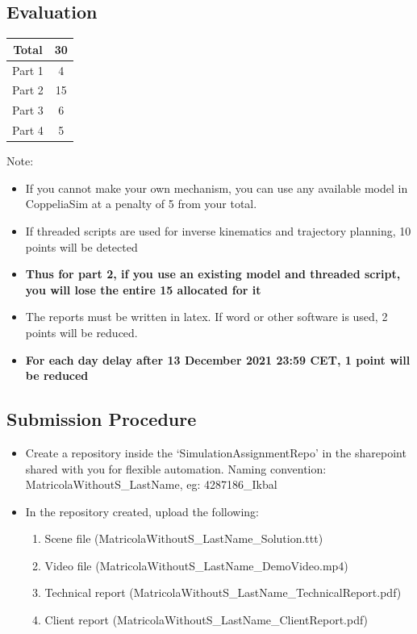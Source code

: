 \documentclass[12pt, a4paper]{article}
\begin{document}
\subsection*{Evaluation}
\begin{center}
\begin{tabular}{ |c|c| } 
 \hline
 Total & 30 \\
 \hline
 Part 1 & 4 \\ 
 Part 2 & 15 \\
 Part 3 & 6\\ 
 Part 4 & 5 \\
 \hline
\end{tabular}
\end{center}


\begin{tcolorbox}[colback=red!5!white,colframe=red!75!black]
Note: 
\begin{itemize}
    \item If you cannot make your own mechanism, you can use any available model in CoppeliaSim at a penalty of 5 from your total.
    \item If threaded scripts are used for inverse kinematics and trajectory planning, 10 points will be detected 
    \item \textbf{Thus for part 2, if you use an existing model and threaded script, you will lose the entire 15 allocated for it}
    \item The reports must be written in latex. If word or other software is used, 2 points will be reduced.
    \item \textbf{For each day delay after 13 December 2021 23:59 CET, 1 point will be reduced}
    \end{itemize}
\end{tcolorbox}
\subsection*{Submission Procedure}
\begin{itemize}
    \item Create a repository inside the `SimulationAssignmentRepo' in the sharepoint shared with you for flexible automation. Naming convention: MatricolaWithoutS\_LastName, eg: 4287186\_Ikbal
    \item In the repository created, upload the following:
        \begin{enumerate}
            \item Scene file (MatricolaWithoutS\_LastName\_Solution.ttt)
            \item Video file (MatricolaWithoutS\_LastName\_DemoVideo.mp4)
            \item Technical report (MatricolaWithoutS\_LastName\_TechnicalReport.pdf)
            \item Client report (MatricolaWithoutS\_LastName\_ClientReport.pdf)
        \end{enumerate}
\end{itemize}
\end{document}
